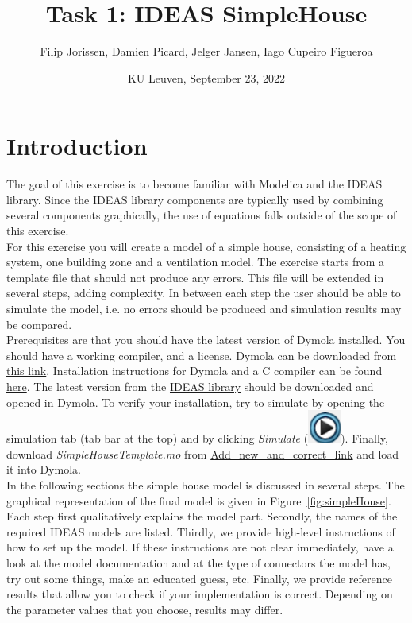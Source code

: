 \documentclass[10pt,a4paper]{article}
\begin{document}
\title{Task 1: IDEAS SimpleHouse}
\author{Filip Jorissen, Damien Picard, Jelger Jansen, Iago Cupeiro Figueroa}
\date{KU Leuven, September 23, 2022}
\maketitle


\doclicenseThis


\section*{Introduction}
The goal of this exercise is to become familiar with 
Modelica and the IDEAS library. 
Since the IDEAS library components are typically used
by combining several components graphically, the use of 
equations falls outside of the scope of this exercise.\\

For this exercise you will create a model of a simple house,
consisting of a heating system, one building zone 
and a ventilation model. 
The exercise starts from a template file that should 
not produce any errors. This file will be extended in
several steps, adding complexity.
In between each step the user should be able to simulate the
model, i.e. no errors should be produced and simulation results 
may be compared.\\

Prerequisites are that you should have the latest version of Dymola
installed. You should have a working compiler, and a license. 
Dymola can be downloaded from 
\href{http://www.3ds.com/products-services/catia/products/dymola/trial-version/}{this link}. 
Installation instructions for Dymola and a C compiler can be found 
\href{http://www.3ds.com/fileadmin/PRODUCTS/CATIA/DYMOLA/PDF/Installation.pdf}{here}.
The latest version from the \href{https://github.com/open-ideas/IDEAS}{IDEAS library} should be downloaded and opened in Dymola. 
To verify your installation, try to simulate  by opening the simulation tab (tab bar at the top) and by clicking \textit{Simulate} (\includegraphics[scale=0.35]{simulate.png}). Finally, download 
\textit{SimpleHouseTemplate.mo} from \url{Add_new_and_correct_link}
and load it into Dymola.\\

In the following sections the simple house model is discussed 
in several steps. The graphical representation of the final model is 
given in Figure~\ref{fig:simpleHouse}.
Each step first qualitatively explains the model part.
Secondly, the names of the required IDEAS models 
are listed.
Thirdly, we provide high-level instructions of how to
set up the model.
If these instructions are not clear immediately, 
have a look at the model documentation and at the type of
connectors the model has, 
try out some things, 
make an educated guess, etc.
Finally, we provide reference results that allow you to check
if your implementation is correct. 
Depending on the parameter values that you choose, results
may differ.
 
\end{document}

